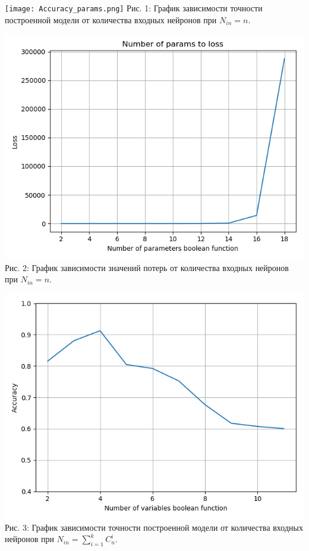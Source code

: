 \documentclass[a4paper,12pt,twoside]{article}
\begin{document}
	\texttt{[image: Accuracy\_params.png]}
	Рис. 1: График зависимости точности построенной модели от количества входных нейронов при $N_{in} = n$.
	
	\includegraphics[width=\linewidth]{Loss_params.png}
	Рис. 2: График зависимости значений потерь от количества входных нейронов при $N_{in} = n$.
	
	\includegraphics[width=\linewidth]{Accuracy_params_teta.png}
	Рис. 3: График зависимости точности построенной модели от количества входных нейронов при $N_{in} = \sum_{i=1}^k C_n^i$.
	
\end{document}
